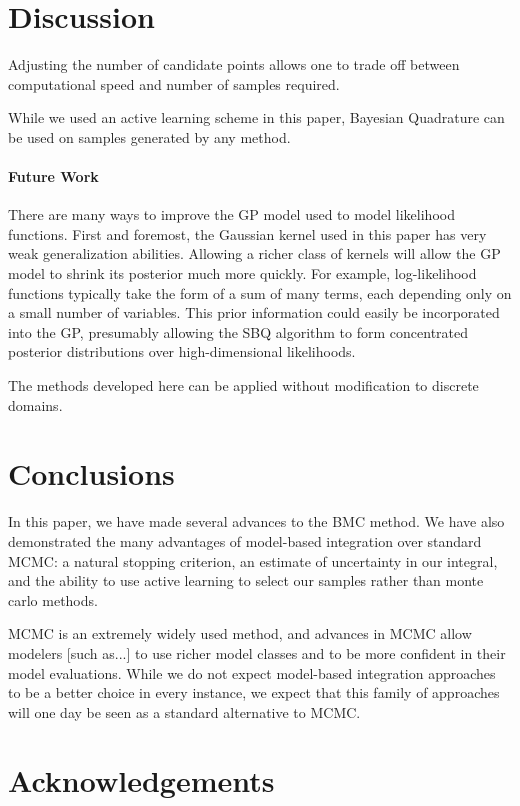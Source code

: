 \documentclass{article}
\begin{document}
\section{Discussion}

Adjusting the number of candidate points allows one to trade off between computational speed and number of samples required.

While we used an active learning scheme in this paper, Bayesian Quadrature can be used on samples generated by any method.

\paragraph{Future Work}There are many ways to improve the GP model used to model likelihood functions.  First and foremost, the Gaussian kernel used in this paper has very weak generalization abilities.  Allowing a richer class of kernels will allow the GP model to shrink its posterior much more quickly.  For example, log-likelihood functions typically take the form of a sum of many terms, each depending only on a small number of variables.  This prior information could easily be incorporated into the GP, presumably allowing the SBQ algorithm to form concentrated posterior distributions over high-dimensional likelihoods.

The methods developed here can be applied without modification to discrete domains.

\section{Conclusions}

 In this paper, we have made several advances to the BMC method.  We have also demonstrated the many advantages of model-based integration over standard MCMC: a natural stopping criterion, an estimate of uncertainty in our integral, and the ability to use active learning to select our samples rather than monte carlo methods.

MCMC is an extremely widely used method, and advances in MCMC allow modelers [such as...] to use richer model classes and to be more confident in their model evaluations.  While we do not expect model-based integration approaches to be a better choice in every instance, we expect that this family of approaches will one day be seen as a standard alternative to MCMC.

\section*{Acknowledgements}



\end{document}
